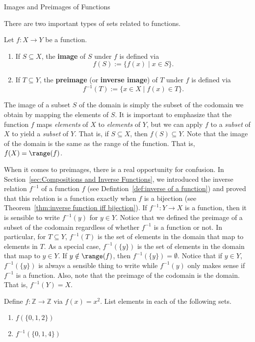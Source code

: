 \begin{section}{Images and Preimages of Functions}\label{sec:Images and Inverse Images}

There are two important types of sets related to functions.

\begin{definition}
Let $f:X\to Y$ be a function.  \begin{enumerate}[label=\textrm{(\alph*)}]
\item If $S\subseteq X$, the \textbf{image} of $S$ under $f$ is defined via
\[
\boxed{f(S):=\{f(x) \mid  x\in S\}}.
\]
\item  If $T\subseteq Y$, the \textbf{preimage} (or \textbf{inverse image}) of $T$ under $f$ is defined via
\[
\boxed{f^{-1}(T):=\{x\in X \mid  f(x)\in T\}}.
\]
\end{enumerate}
\end{definition}

The image of a subset $S$ of the domain is simply the subset of the codomain we obtain by mapping the elements of $S$. It is important to emphasize that the function $f$ maps \emph{elements} of $X$ to \emph{elements} of $Y$, but we can apply $f$ to a \emph{subset} of $X$ to yield a \emph{subset} of $Y$.  That is, if $S\subseteq X$, then $f(S)\subseteq Y$. Note that the image of the domain is the same as the range of the function.  That is, $f(X)=\range(f)$. 

When it comes to preimages, there is a real opportunity for confusion.  In Section~\ref{sec:Compositions and Inverse Functions}, we introduced the inverse relation $f^{-1}$ of a function $f$ (see Defintion~\ref{def:inverse of a function}) and proved that this relation is a function exactly when $f$ is a bijection (see Theorem~\ref{thm:inverse function iff bijection}). If $f^{-1}:Y\to X$ is a function, then it is sensible to write $f^{-1}(y)$ for $y\in Y$.  Notice that we defined the preimage of a subset of the codomain regardless of whether $f^{-1}$ is a function or not. In particular, for $T\subseteq Y$, $f^{-1}(T)$ is the set of elements in the domain that map to elements in $T$. As a special case, $f^{-1}(\{y\})$ is the set of elements in the domain that map to $y\in Y$.  If $y\notin \range(f)$, then $f^{-1}(\{y\})=\emptyset$. Notice that if $y\in Y$, $f^{-1}(\{y\})$ is always a sensible thing to write while $f^{-1}(y)$ only makes sense if $f^{-1}$ is a function. Also, note that the preimage of the codomain is the domain.  That is, $f^{-1}(Y)=X$.

\begin{problem}
Define $f:\mathbb{Z}\to\mathbb{Z}$ via $f(x)=x^2$. List elements in each of the following sets.
\begin{enumerate}[label=\textrm{(\alph*)}]
\item $f(\{0,1,2\})$
\item $f^{-1}(\{0,1,4\})$
\end{enumerate}
\end{problem}


\end{section}

